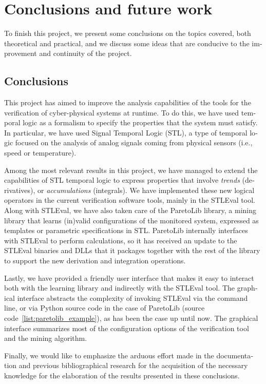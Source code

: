 \chapter{Conclusions and future work}
\label{cha:concl_en}
\begin{otherlanguage}{british}
To finish this project, we present some conclusions on the topics covered, both theoretical and practical, and we discuss some ideas that are conducive to the improvement and continuity of the project.

\section{Conclusions}
This project has aimed to improve the analysis capabilities of the tools for the verification of cyber-physical systems at runtime. To do this, we have used temporal logic as a formalism to specify the properties that the system must satisfy. In particular, we have used Signal Temporal Logic (STL), a type of temporal logic focused on the analysis of analog signals coming from physical sensors (i.e., speed or temperature).

Among the most relevant results in this project, we have managed to extend the capabilities of STL temporal logic to express properties that involve \textit{trends} (derivatives), or \textit{accumulations} (integrals). We have implemented these new logical operators in the current verification software tools, mainly in the STLEval tool. Along with STLEval, we have also taken care of the ParetoLib library, a mining library that learns (in)valid configurations of the monitored system, expressed as templates or parametric specifications in STL. ParetoLib internally interfaces with STLEval to perform calculations, so it has received an update to the STLEval binaries and DLLs that it packages together with the rest of the library to support the new derivation and integration operations.

Lastly, we have provided a friendly user interface that makes it easy to interact both with the learning library and indirectly with the STLEval tool. The graphical interface abstracts the complexity of invoking STLEval via the command line, or via Python source code in the case of ParetoLib (source code~\ref{list:paretolib_example}), as has been the case up until now. The graphical interface summarizes most of the configuration options of the verification tool and the mining algorithm.

Finally, we would like to emphasize the arduous effort made in the documentation and previous bibliographical research for the acquisition of the necessary knowledge for the elaboration of the results presented in these conclusions.


\end{otherlanguage}
